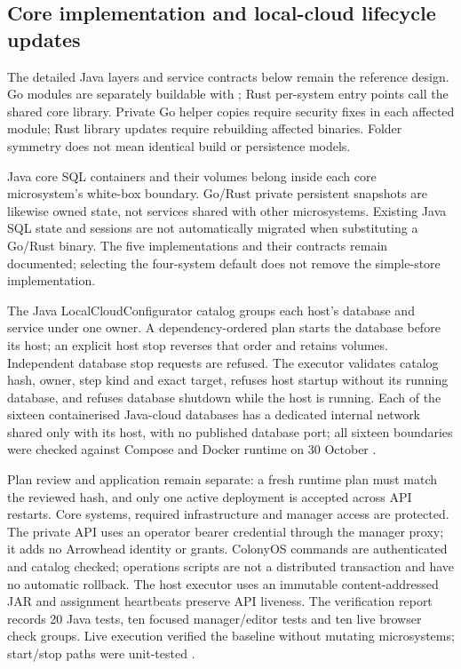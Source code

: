 \documentclass[a4paper]{arrowhead}
\begin{document}
\subsection{Core implementation and local-cloud lifecycle updates}
\label{sec:core-lifecycle-update}
The detailed Java layers and service contracts below remain the reference design.
Go modules are separately buildable with ; Rust per-system entry
points call the shared core library. Private Go helper copies require security
fixes in each affected module; Rust library updates require rebuilding affected
binaries. Folder symmetry does not mean identical build or persistence models.

Java core SQL containers and their volumes belong inside each core microsystem's
white-box boundary. Go/Rust private persistent snapshots are likewise owned
state, not services shared with other microsystems. Existing Java SQL state and
sessions are not automatically migrated when substituting a Go/Rust binary.
The five implementations and their contracts remain documented; selecting the
four-system default does not remove the simple-store implementation.

The Java LocalCloudConfigurator catalog groups each host's database and service
under one owner. A dependency-ordered plan starts the database before its host;
an explicit host stop reverses that order and retains volumes. Independent
database stop requests are refused. The executor validates catalog hash, owner,
step kind and exact target, refuses host startup without its running database,
and refuses database shutdown while the host is running. Each of the sixteen
containerised Java-cloud databases has a dedicated internal network shared only
with its host, with no published database port; all sixteen boundaries were
checked against Compose and Docker runtime on 30 October
\cite{javaDatabaseAssets20261030}.

Plan review and application remain separate: a fresh runtime plan must match the
reviewed hash, and only one active deployment is accepted across API restarts.
Core systems, required infrastructure and manager access are protected. The
private API uses an operator bearer credential through the manager proxy; it
adds no Arrowhead identity or grants. ColonyOS commands are authenticated and
catalog checked; operations scripts are not a distributed transaction and have
no automatic rollback. The host executor uses an immutable content-addressed JAR
and assignment heartbeats preserve API liveness. The verification report records
20 Java tests, ten focused manager/editor tests and ten live browser check
groups. Live execution verified the baseline without mutating microsystems;
start/stop paths were unit-tested \cite{javaDatabaseAssets20261030}.
\end{document}
